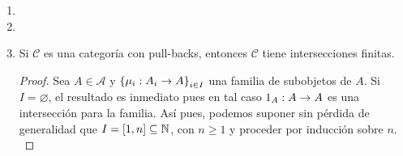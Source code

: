 \documentclass{article}
\begin{document}
\begin{enumerate}[label=\textbf{Ej \arabic*.}]
\begin{proof}
			\begin{align*}
				\commutativesquare{A=\copyandpaste,B=A_2,C=A_1,D=A,f=\pi_2,g=\pi_1,h=\alpha_2,k=\alpha_1,}.
			\end{align*}
			Ahora, si $P\in Mod\lrprth{R}$ y $\catarrow{\beta_1}{P}{A_1}{},\catarrow{\beta_2}{P}{A_2}{}$ son morfismos de $R$-módulos tales que $\alpha_1\beta_1=\alpha_2\beta_2$, entonces sea
			\begin{align*}
				\descapp{\gamma}{P}{\copyandpaste}{p}{\lrprth{\beta_1\lrprth{p},\beta_2\lrprth{p}}}{.}
			\end{align*}
			Notemos que $\gamma$ es un morfismo de $R$-módulos, puesto que $\beta_1$ y $\beta_2$ lo son, y que si $p\in P$ entonces
			\begin{align*}
				\pi_1\gamma\lrprth{p}&=\pi_1\lrprth{\beta_1\lrprth{p},\beta_2\lrprth{p}}=\beta_1\lrprth{p}\\
				\implies \pi_1\gamma&=\beta_1.
			\end{align*}
			Análogamente se verifica que $\pi_2\gamma=\beta_2$, con lo cual el siguiente diagrama conmuta
			\begin{equation*}
				\commutativesquare{up=t,A=\copyandpaste,B=A_2,C=A_1,D=A,f=\pi_2,g=\pi_1,h=\alpha_2,k=\alpha_1,l=\beta_2,m=\beta_1,n=\gamma,}
			\end{equation*}
			Finalmente, si $\catarrow{\gamma'}{P}{\copyandpaste}{}$ es un morfismo de $R$-módulos tal que $\pi_1\gamma'=\beta_1$ y $\pi_2\gamma'=\beta_2$ y $p\in P$, entonces
			\begin{align*}
				\pi_1\gamma'\lrprth{p}&=\beta_1\lrprth{p},\\
				\pi_2\gamma'\lrprth{p}&=\beta_2\lrprth{p},
			\end{align*}
			con lo cual $\gamma'\lrprth{p}=\lrprth{\pi_1\lrprth{\gamma'\lrprth{p}},\pi_2\lrprth{\gamma'\lrprth{p}}}=\lrprth{\beta_1\lrprth{p},\beta_2\lrprth{p}}=\gamma\lrprth{p}$ y por lo tanto $\gamma'=\gamma$.\\
		\end{proof}
		\item 
		\item
		\item Si $\mathscr{C}$ es una categoría con pull-backs, entonces $\mathscr{C}$ tiene intersecciones finitas.
		\begin{proof}
			Sea $A\in\mathscr{A}$ y $\lrbrack{\catarrow{\mu_i}{A_i}{A}{}}_{i\in I}$ una familia de subobjetos de $A$. Si $I=\varnothing$, el resultado es inmediato pues en tal caso $\catarrow{1_A}{A}{A}{}$ es una intersección para la familia. Así pues, podemos suponer sin pérdida de generalidad que $I=\left[1,n\right]\subseteq\mathbb{N}$, con $n\geq 1$ y proceder por inducción sobre $n$.\\

\end{proof}
\end{enumerate}
\end{document}
